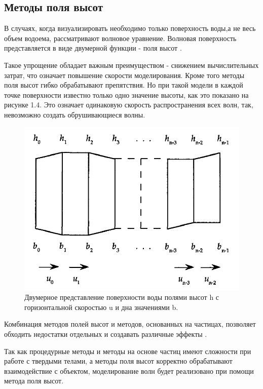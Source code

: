 \subsection{Методы поля высот}

В случаях, когда визуализировать необходимо только поверхность воды,а не весь объем водоема, рассматривают волновое уравнение. Волновая поверхность представляется в виде двумерной функции - поля высот \cite{field}. 

Такое упрощение обладает важным преимуществом - снижением вычислительных затрат, что означает повышение скорости моделирования. Кроме того методы поля высот гибко обрабатывают препятствия. Но при такой модели в каждой точке поверхности известно только одно значение высоты, как это показано на рисунке 1.4. Это означает одинаковую скорость распространения всех волн, так, невозможно создать обрушивающиеся волны.

\begin{figure}[H]
	\begin{center}
		\includegraphics[scale=0.3]{img/height-field.png}
	\end{center}
	\captionsetup{justification=centering}
	\caption{Двумерное представление поверхности воды полями высот h с горизонтальной скоростью u и дна значениями b. }
	\label{img:height-field}
\end{figure}

Комбинация методов полей высот и методов, основанных на частицах, позволяет обходить недостатки отдельных и создавать различные эффекты \cite{shallow}\cite{large-small}.

Так как процедурные методы и методы на основе частиц имеют сложности при работе с твердыми телами, а методы поля высот корректно обрабатывают взаимодействие с объектом, моделирование волн будет реализовано при помощи метода поля высот.

